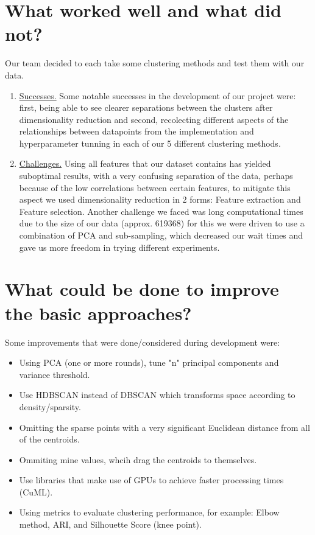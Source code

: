 \documentclass[11pt, fullpage,letterpaper]{article}
\begin{document}
\section{What worked well and what did not?}
\begin{flushleft}
Our team decided to each take some clustering methods and test them with our data.
\begin{enumerate}
    \item \underline{Successes.} Some notable successes in the development of our project were: first, being able to see
    clearer separations between the clusters after dimensionality reduction and second, recolecting different aspects of
    the relationships between datapoints from the implementation and hyperparameter tunning in each of our 5 different clustering methods.

    \item \underline{Challenges.} Using all features that our dataset contains has yielded suboptimal results,
    with a very confusing separation of the data, perhaps because of the low correlations between certain
    features, to mitigate this aspect we used dimensionality reduction in 2 forms: Feature extraction and Feature
    selection. Another challenge we faced was long computational times due to the size of our data (approx. 619368)
    for this we were driven to use a combination of PCA and sub-sampling, which decreased our wait times
    and gave us more freedom in trying different experiments.
\end{enumerate}

\end{flushleft}

\section{What could be done to improve the basic approaches?}
\begin{flushleft}
    Some improvements that were done/considered during development were:
    \begin{itemize}
        \item Using PCA (one or more rounds), tune "n" principal components and variance threshold.
        \item Use HDBSCAN instead of DBSCAN which transforms space according to density/sparsity.
        \item Omitting the sparse points with a very significant Euclidean distance from all of the centroids.
        \item Ommiting mine values, whcih drag the centroids to themselves.
        \item Use libraries that make use of GPUs to achieve faster processing times (CuML).
        \item Using metrics to evaluate clustering performance, for example: Elbow method, ARI, and Silhouette Score (knee point).
    \end{itemize}
\end{flushleft}
\end{document}
